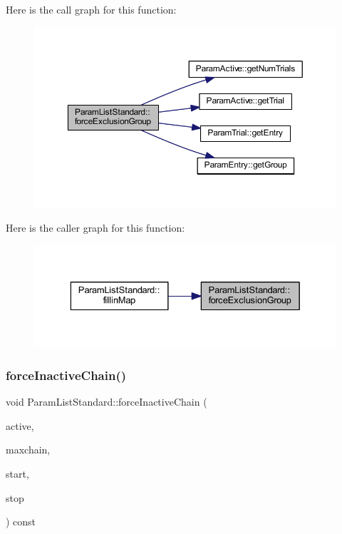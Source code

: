 Here is the call graph for this function\+:
\nopagebreak
\begin{figure}[H]
\begin{center}
\leavevmode
\includegraphics[width=350pt]{class_param_list_standard_a97ad61c3065470a692b401d3234f642a_cgraph}
\end{center}
\end{figure}
Here is the caller graph for this function\+:
\nopagebreak
\begin{figure}[H]
\begin{center}
\leavevmode
\includegraphics[width=329pt]{class_param_list_standard_a97ad61c3065470a692b401d3234f642a_icgraph}
\end{center}
\end{figure}
\mbox{\label{class_param_list_standard_a551c148ffe5eb58a1f431b7e884f4de2}} 
\subsubsection{\texorpdfstring{forceInactiveChain()}{forceInactiveChain()}}
{\footnotesize\ttfamily void Param\+List\+Standard\+::force\+Inactive\+Chain (\begin{DoxyParamCaption}\item[{\mbox{\hyperlink{class_param_active}{Param\+Active}} $\ast$}]{active,  }\item[{int4}]{maxchain,  }\item[{int4}]{start,  }\item[{int4}]{stop }\end{DoxyParamCaption}) const\hspace{0.3cm}{\ttfamily [protected]}}



